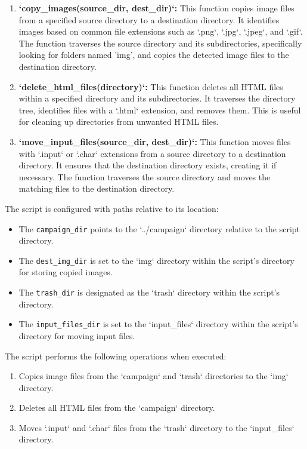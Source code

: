\begin{enumerate}
    \item \textbf{`copy\_images(source\_dir, dest\_dir)`:} This function copies image files from a specified source directory to a destination directory. It identifies images based on common file extensions such as `.png`, `.jpg`, `.jpeg`, and `.gif`. The function traverses the source directory and its subdirectories, specifically looking for folders named 'img', and copies the detected image files to the destination directory.

    \item \textbf{`delete\_html\_files(directory)`:} This function deletes all HTML files within a specified directory and its subdirectories. It traverses the directory tree, identifies files with a `.html` extension, and removes them. This is useful for cleaning up directories from unwanted HTML files.

    \item \textbf{`move\_input\_files(source\_dir, dest\_dir)`:} This function moves files with `.input` or `.char` extensions from a source directory to a destination directory. It ensures that the destination directory exists, creating it if necessary. The function traverses the source directory and moves the matching files to the destination directory.
\end{enumerate}

The script is configured with paths relative to its location:
\begin{itemize}
    \item The \texttt{campaign\_dir} points to the `../campaign` directory relative to the script directory.
    \item The \texttt{dest\_img\_dir} is set to the `img` directory within the script's directory for storing copied images.
    \item The \texttt{trash\_dir} is designated as the `trash` directory within the script's directory.
    \item The \texttt{input\_files\_dir} is set to the `input\_files` directory within the script's directory for moving input files.
\end{itemize}

The script performs the following operations when executed:
\begin{enumerate}
    \item Copies image files from the `campaign` and `trash` directories to the `img` directory.
    \item Deletes all HTML files from the `campaign` directory.
    \item Moves `.input` and `.char` files from the `trash` directory to the `input\_files` directory.
\end{enumerate}

